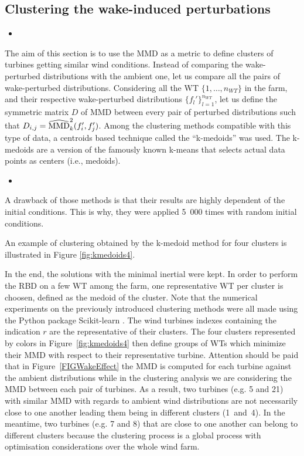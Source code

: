 \subsection{Clustering the wake-induced perturbations}

\begin{itemize}
    \item  
\end{itemize}
The aim of this section is to use the MMD as a metric to define clusters of turbines getting similar wind conditions. 
Instead of comparing the wake-perturbed distributions with the ambient one, let us compare all the pairs of wake-perturbed distributions. 
Considering all the WT $\{1, \dots, n_{WT}\}$ in the farm, and their respective wake-perturbed distributions $\{f_l'\}_{l=1}^{n_{WT}}$, let us define the symmetric matrix $D$ of MMD between every pair of perturbed distributions such that $D_{i, j} = \widehat{\mathrm{MMD}}^2_k(f_i', f_j')$. 
Among the clustering methods compatible with this type of data, a centroids based technique called the ``k-medoids'' was used. 
The k-medoids \citep{park_2009} are a version of the famously known k-means that selects actual data points as centers (i.e., medoids). 

\begin{itemize}
    \item 
\end{itemize}

A drawback of those methods is that their results are highly dependent of the initial conditions. 
This is why, they were applied 5~000 times with random initial conditions. 

An example of clustering obtained by the k-medoid method for four clusters is illustrated in Figure \ref{fig:kmedoids4}. 

In the end, the solutions with the minimal inertial were kept. 
In order to perform the RBD on a few WT among the farm, one representative WT per cluster is choosen, defined as the medoid of the cluster. 
Note that the numerical experiments on the previously introduced clustering methods were all made using the Python package Scikit-learn \cite{scikit-learn}. 
The wind turbines indexes containing the indication $r$ are the representative of their clusters. 
The four clusters represented by colors in Figure~\ref{fig:kmedoids4} then define groups of WTs which minimize their MMD with respect to their representative turbine. 
Attention should be paid that in Figure~\ref{FIGWakeEffect} the MMD is computed for each turbine against the ambient distributions while in the clustering analysis we are considering the MMD between each pair of turbines. 
As a result, two turbines (e.g. 5 and 21) with similar MMD with regards to ambient wind distributions are not necessarily close to one another leading them being in different clusters (1~and~4). 
In the meantime, two turbines (e.g. 7 and 8) that are close to one another can belong to different clusters because the clustering process is a global process with optimisation considerations over the whole wind farm.






